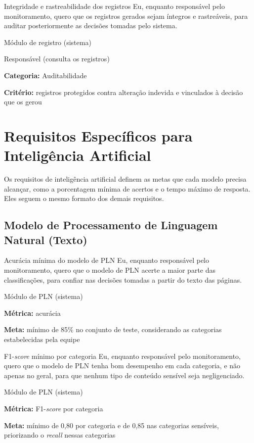\documentclass[
    12pt,           %
    oneside,        %
    a4paper,        %
    chapter=TITLE,  %
    english,        %
    brazil          %
]{abntex2}
\begin{document}
{Integridade e rastreabilidade dos registros}
{Eu, enquanto responsável pelo monitoramento, quero que os registros gerados sejam íntegros e rastreáveis, para auditar posteriormente as decisões tomadas pelo sistema.}
{\begin{dadoslista}
\item Módulo de registro (sistema)
\item Responsável (consulta os registros)
\end{dadoslista}}
{\begin{dadoslista}
\item \textbf{Categoria:} Auditabilidade
\item \textbf{Critério:} registros protegidos contra alteração indevida e vinculados à decisão que os gerou
\end{dadoslista}}

\section{Requisitos Específicos para Inteligência Artificial}

Os requisitos de inteligência artificial definem as metas que cada modelo
precisa alcançar, como a porcentagem mínima de acertos e o tempo máximo de
resposta. Eles seguem o mesmo formato dos demais requisitos.
\subsection{Modelo de Processamento de Linguagem Natural (Texto)}

{Acurácia mínima do modelo de PLN}
{Eu, enquanto responsável pelo monitoramento, quero que o modelo de PLN acerte a maior parte das classificações, para confiar nas decisões tomadas a partir do texto das páginas.}
{\begin{dadoslista}
\item Módulo de PLN (sistema)
\end{dadoslista}}
{\begin{dadoslista}
\item \textbf{Métrica:} acurácia
\item \textbf{Meta:} mínimo de 85\% no conjunto de teste, considerando as categorias estabelecidas pela equipe
\end{dadoslista}}

{F1-\textit{score} mínimo por categoria}
{Eu, enquanto responsável pelo monitoramento, quero que o modelo de PLN tenha bom desempenho em cada categoria, e não apenas no geral, para que nenhum tipo de conteúdo sensível seja negligenciado.}
{\begin{dadoslista}
\item Módulo de PLN (sistema)
\end{dadoslista}}
{\begin{dadoslista}
\item \textbf{Métrica:} F1-\textit{score} por categoria
\item \textbf{Meta:} mínimo de 0,80 por categoria e de 0,85 nas categorias sensíveis, priorizando o \textit{recall} nessas categorias
\end{dadoslista}}
\end{document}
